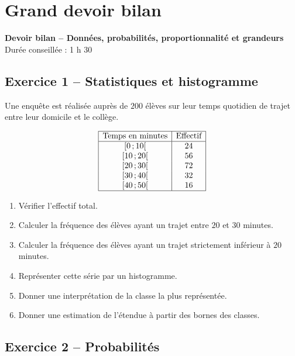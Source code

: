 \documentclass[11pt,a4paper]{article}
\newcommand{\intervalle}[2]{\ensuremath{[#1\,;#2[}}
\begin{document}
\newpage

\section{Grand devoir bilan}

\begin{center}
{\Large \textbf{Devoir bilan -- Données, probabilités, proportionnalité et grandeurs}}\\
Durée conseillée : 1 h 30
\end{center}

\subsection*{Exercice 1 -- Statistiques et histogramme}

Une enquête est réalisée auprès de $200$ élèves sur leur temps quotidien de trajet entre leur domicile et le collège.

\[
\begin{array}{|c|c|}
\hline
\text{Temps en minutes} & \text{Effectif} \\
\hline
\intervalle{0}{10} & 24 \\
\intervalle{10}{20} & 56 \\
\intervalle{20}{30} & 72 \\
\intervalle{30}{40} & 32 \\
\intervalle{40}{50} & 16 \\
\hline
\end{array}
\]

\begin{enumerate}
    \item Vérifier l'effectif total.
    \item Calculer la fréquence des élèves ayant un trajet entre $20$ et $30$ minutes.
    \item Calculer la fréquence des élèves ayant un trajet strictement inférieur à $20$ minutes.
    \item Représenter cette série par un histogramme.
    \item Donner une interprétation de la classe la plus représentée.
    \item Donner une estimation de l'étendue à partir des bornes des classes.
\end{enumerate}

\subsection*{Exercice 2 -- Probabilités}
\end{document}
